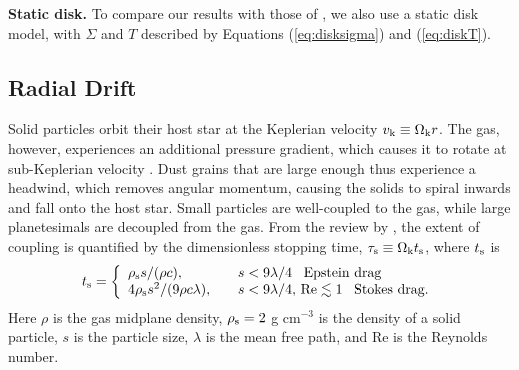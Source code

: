 \documentclass[apj]{emulateapj}
\begin{document}


\textbf{Static disk.} To compare our results with those of \citet{oberg11}, we also use a static disk model, with $\Sigma$ and $T$ described by Equations (\ref{eq:disksigma}) and (\ref{eq:diskT}). %


\subsection{Radial Drift}
\label{sec:drift}

Solid particles orbit their host star at the Keplerian velocity $v_{\rm k} \equiv \Omega_{\rm k} r$. The gas, however, experiences an additional pressure gradient, which causes it to rotate at sub-Keplerian velocity \citep{weidenschilling77}. Dust grains that are large enough thus experience a headwind, which removes angular momentum, causing the solids to spiral inwards and fall onto the host star. Small particles are well-coupled to the gas, while large planetesimals are decoupled from the gas. From the review by \citet{chiang10}, the extent of coupling is quantified by the dimensionless stopping time, $\tau_{\rm s} \equiv \Omega_{\rm k} t_{\rm s}$, where $t_{\rm s}$ is
\begin{equation}
\label{eq:ts}
t_{\rm s}= \left\{
\begin{array}{l l}
\rho_{\rm s} s / (\rho c), & \quad s < 9 \lambda/4 \,\,\,\ \text{Epstein drag} \\
4 \rho_{\rm s} s^2 / (9 \rho c \lambda), & \quad s < 9 \lambda/4, \,\text{Re} \lesssim 1 \,\,\,\ \text{Stokes drag.}
\end{array} 
\right.
\end{equation}
Here $\rho$ is the gas midplane density, $\rho_{\rm s}=2$ g cm$^{-3}$ is the density of a solid particle, $s$ is the particle size, $\lambda$ is the mean free path, and Re is the Reynolds number. 
\end{document}
